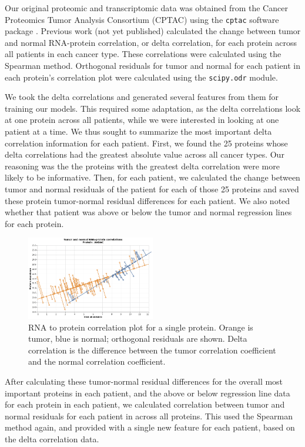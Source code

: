 \documentclass{article}
\begin{document}
Our original proteomic and transcriptomic data was obtained from the Cancer Proteomics Tumor Analysis Consortium (CPTAC) \cite{rodriguez_next_2021} using the \texttt{cptac} software package \cite{lindgren_simplified_2021}. Previous work (not yet published) calculated the change between tumor and normal RNA-protein correlation, or delta correlation, for each protein across all patients in each cancer type. These correlations were calculated using the Spearman method. Orthogonal residuals for tumor and normal for each patient in each protein's correlation plot were calculated using the \texttt{scipy.odr} module.

We took the delta correlations and generated several features from them for training our models. This required some adaptation, as the delta correlations look at one protein across all patients, while we were interested in looking at one patient at a time. We thus sought to summarize the most important delta correlation information for each patient. First, we found the 25 proteins whose delta correlations had the greatest absolute value across all cancer types. Our reasoning was the the proteins with the greatest delta correlation were more likely to be informative. Then, for each patient, we calculated the change between tumor and normal residuals of the patient for each of those 25 proteins and saved these protein tumor-normal residual differences for each patient. We also noted whether that patient was above or below the tumor and normal regression lines for each protein.

\begin{figure}[H]
    \centering
    \includegraphics[width=0.5\textwidth]{deltacorr}
    \caption{RNA to protein correlation plot for a single protein. Orange is tumor, blue is normal; orthogonal residuals are shown. Delta correlation is the difference between the tumor correlation coefficient and the normal correlation coefficient.}
    \label{fig:deltacorr}
\end{figure}

After calculating these tumor-normal residual differences for the overall most important proteins in each patient, and the above or below regression line data for each protein in each patient, we calculated correlation between tumor and normal residuals for each patient in across all proteins. This used the Spearman method again, and provided with a single new feature for each patient, based on the delta correlation data.
\end{document}
